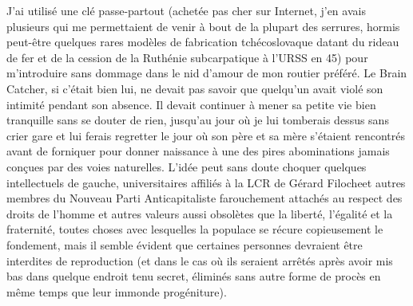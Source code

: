 %
J’ai utilisé une clé passe-partout (achetée pas cher sur Internet, j’en avais plusieurs qui me permettaient de venir à bout de la plupart des serrures, hormis peut-être quelques rares modèles de fabrication tchécoslovaque datant du rideau de fer et de la cession de la Ruthénie subcarpatique à l’URSS en 45) pour m’introduire sans dommage dans le nid d’amour de mon routier préféré. Le Brain Catcher, si c’était bien lui, ne devait pas savoir que quelqu’un avait violé son intimité pendant son absence. Il devait continuer à mener sa petite vie bien tranquille sans se douter de rien, jusqu’au jour où je lui tomberais dessus sans crier gare et lui ferais regretter le jour où son père et sa mère s’étaient rencontrés avant de forniquer pour donner naissance à une des pires abominations jamais conçues par des voies naturelles. L’idée peut sans doute choquer quelques intellectuels de gauche, universitaires affiliés à la LCR de Gérard Filocheet autres membres du Nouveau Parti Anticapitaliste farouchement attachés au respect des droits de l’homme et autres valeurs aussi obsolètes que la liberté, l’égalité et la fraternité, toutes choses avec lesquelles la populace se récure copieusement le fondement, mais il semble évident que certaines personnes devraient être interdites de reproduction (et dans le cas où ils seraient arrêtés après avoir mis bas dans quelque endroit tenu secret, éliminés sans autre forme de procès en même temps que leur immonde progéniture).

